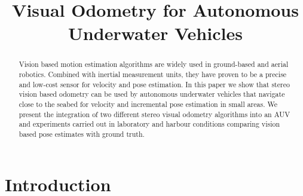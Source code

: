 \documentclass[conference]{IEEEtran}
\begin{document}
\title{Visual Odometry for Autonomous Underwater Vehicles}


\author{
}

\maketitle


\begin{abstract}
Vision based motion estimation algorithms are widely used in ground-based and aerial robotics. Combined with inertial measurement units, they have proven to be a precise and low-cost sensor for velocity and pose estimation. In this paper we show that stereo vision based odometry can be used by autonomous underwater vehicles that navigate close to the seabed for velocity and incremental pose estimation in small areas. We present the integration of two different stereo visual odometry algorithms into an AUV and experiments carried out in laboratory and harbour conditions comparing vision based pose estimates with ground truth.
\end{abstract}


\section{Introduction 
  \label{introduction}
}
\end{document}

